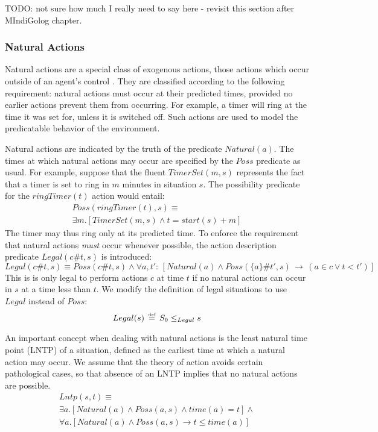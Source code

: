 TODO: not sure how much I really need to say here - revisit this section
after MIndiGolog chapter.


\subsubsection{Natural Actions}

Natural actions are a special class of exogenous actions, those actions
which occur outside of an agent's control \citep{reiter96sc_nat_conc}.
They are classified according to the following requirement: natural
actions must occur at their predicted times, provided no earlier actions
prevent them from occurring. For example, a timer will ring at the
time it was set for, unless it is switched off. Such actions are used
to model the predicatable behavior of the environment.

Natural actions are indicated by the truth of the predicate $Natural(a)$.
The times at which natural actions may occur are specified by the
$Poss$ predicate as usual. For example, suppose that the fluent $TimerSet(m,s)$
represents the fact that a timer is set to ring in $m$ minutes in
situation $s$. The possibility predicate for the $ringTimer(t)$
action would entail:\begin{multline*}
Poss(ringTimer(t),s)\equiv\\
\exists m.\left[TimerSet(m,s)\wedge t=start(s)+m\right]\end{multline*}
 The timer may thus ring only at its predicted time. To enforce the
requirement that natural actions \emph{must} occur whenever possible,
the action description predicate $Legal(c\#t,s)$ is introduced:\[
Legal(c\#t,s)\equiv Poss(c\#t,s)\wedge\forall a,t':\,\left[Natural(a)\wedge Poss(\{a\}\#t',s)\,\rightarrow\,\left(a\in c\vee t<t'\right)\right]\]
 This is is only legal to perform actions $c$ at time $t$ if no
natural actions can occur in $s$ at a time less than $t$. We modify
the definition of legal situations to use $Legal$ instead of $Poss$:\[
Legal(s)\,\stackrel{\mbox{\tiny def}}{=}\, S_{0}\leq_{Legal}s\]


An important concept when dealing with natural actions is the least
natural time point (LNTP) of a situation, defined as the earliest
time at which a natural action may occur. We assume that the theory
of action avoids certain pathological cases, so that absence of an
LNTP implies that no natural actions are possible.\begin{multline*}
Lntp(s,t)\equiv\\
\exists a.\left[Natural(a)\wedge Poss(a,s)\wedge time(a)=t\right]\wedge\\
\forall a.\left[Natural(a)\wedge Poss(a,s)\rightarrow t\leq time(a)\right]\end{multline*}



